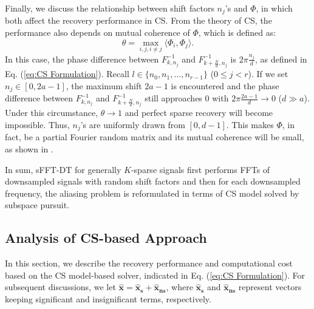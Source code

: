 \documentclass[journal,onecolumn,11pt]{IEEEtran}
\begin{document}
Finally, we discuss the relationship between shift factors $n_{j}$'s and $\Phi$, in which both affect the recovery performance in CS.
From the theory of CS, the performance also depends on mutual coherence of $\Phi$, which is defined as:
\small
\begin{equation}
\theta = \max_{i,j, i\neq j} \langle \Phi_{i},\Phi_{j}\rangle.
\label{eq:mutual incoherence}
\end{equation}
\normalsize
In this case, the phase difference between $F_{k,n_{j}}^{-1}$ and $F_{k+\frac{N}{d},n_{j}}^{-1}$ is $2\pi\frac{n_{j}}{d}$, as defined in Eq. (\ref{eq:CS Formulation}).
Recall $l \in \{ n_{0},n_{1},...,n_{r-1} \}$ ($0\leq j < r$).
If we set $n_{j}\in [0,2a-1]$, the maximum shift $2a-1$ is encountered and the phase difference between $F_{k,n_{j}}^{-1}$ and $F_{k+\frac{N}{d},n_{j}}^{-1}$ still approaches $0$ with $ 2\pi\frac{2a-1}{d} \rightarrow 0$ ($d \gg a$).
Under this circumstance, $\theta \rightarrow 1$ and perfect sparse recovery will become impossible.
Thus, $n_{j}$'s are uniformly drawn from $[0,d-1]$.
This makes $\Phi$, in fact, be a partial Fourier random matrix and its mutual coherence will be small, as shown in \cite{Candes2006-F}.

In sum, sFFT-DT for generally $K$-sparse signals first performs FFTs of downsampled signals with random shift factors and then for each downsampled frequency, the aliasing problem is reformulated in terms of CS model solved by subspace pursuit.

\subsection{Analysis of CS-based Approach}\label{Sec: Analysis CS}
In this section, we describe the recovery performance and computational cost based on the CS model-based solver, indicated in Eq. (\ref{eq:CS Formulation}).
For subsequent discussions, we let $\bm{\hat{x}}= \bm{\hat{x}_{s}} +\bm{\hat{x}_{ns} }$, where $\bm{\hat{x}_{s}}$ and $\bm{\hat{x}_{ns}} $ represent vectors keeping significant and insignificant terms, respectively.
\end{document}
